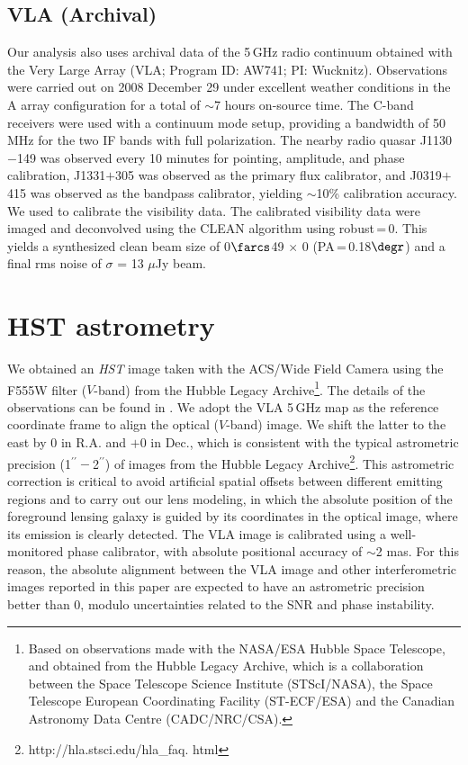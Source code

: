 \documentclass[]{emulateapj}
\begin{document}
\subsection{VLA (Archival)} %
Our analysis also uses archival data of the 5\,GHz
radio continuum obtained with the
Very Large Array (VLA; Program ID: AW741; PI: Wucknitz).
Observations were carried out on 2008 December 29 under excellent weather
conditions in the A array configuration for a total of $\sim$7 hours on-source time. The C-band receivers were used with a continuum mode setup,
providing a bandwidth of 50 MHz for the two IF bands with full polarization.
The nearby radio quasar J1130$-$149 was observed every 10 minutes for
pointing, amplitude, and phase calibration, J1331$+$305 was observed as the
primary flux calibrator, and J0319$+$415 was observed as the bandpass
calibrator, yielding $\sim$10\% calibration accuracy.
We used  to calibrate the visibility data.
The calibrated visibility data were imaged and deconvolved using
the CLEAN algorithm using robust\,=\,0. This yields a synthesized clean
beam size of 0$\farcs$49 $\times$ 0 (PA\,=\,0.18$\degr$) and a final
rms noise of $\sigma$ = 13 $\mu$Jy beam\pmOne.


\section{HST astrometry} \label{sec:HST}
We obtained an {\it HST} image taken with
the ACS/Wide Field Camera 
using the F555W filter ($V$-band)
from the
Hubble Legacy Archive\footnote{Based on observations
made with the NASA/ESA Hubble Space Telescope, and obtained from the Hubble
Legacy Archive, which is a collaboration between the Space Telescope Science
Institute (STScI/NASA), the Space Telescope European Coordinating Facility
(ST-ECF/ESA) and the Canadian Astronomy Data Centre (CADC/NRC/CSA).}. 
The details of the observations can be found
in .
We adopt the VLA 5\,GHz map as the
reference coordinate frame to align the optical ($V$-band) image.
We shift the latter to the east by 0 in R.A. and $+$0 in
Dec., which is consistent with the typical astrometric precision (1$^{\prime\prime}-$2$^{\prime\prime}$) of
images from the Hubble Legacy Archive\footnote{http://hla.stsci.edu/hla\_faq.
html}. This astrometric correction is critical to avoid artificial spatial
offsets between different emitting regions and to carry out our lens modeling,
in which the absolute position of the foreground lensing galaxy is guided by its
coordinates in the optical image, where its emission is clearly detected.
The VLA image is calibrated using a well-monitored phase
calibrator, with absolute positional accuracy of $\sim$2 mas.
For this reason, the absolute alignment between the VLA image and other
interferometric images reported in this paper are expected to have an astrometric
precision better than 0, modulo uncertainties related to the SNR and phase
instability.
\end{document}
